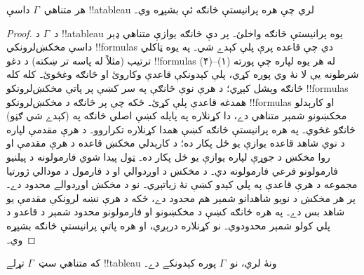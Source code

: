 \documentclass[../../../include/open-logic-section]{subfiles}
\begin{document}
\begin{prop}
  هر متناهي~$\Gamma$ داسې !!a{tableau} لري چې هره پرانيستې څانګه ئې بشپړه وي۔
\end{prop}

\begin{proof}
  د~$\Gamma$ د !!a{tableau} يوه پرانيستې څانګه واخلئ۔ پر دې
  څانګه يوازې متناهي ډېر داسې مخکښ‌لرونکي !!{formula}s دي چې
  قاعده پرې پلې کېدے شي۔ په يوه ټاکلي ترتيب (مثلاً له پاسه
  تر ښکته) د دغو !!{formula}s له هر يوه لپاره چې پورته (۱)–(۴) شرطونه
  يې لا نۀ وي پوره کړي، پلې کېدونکې قاعدې وکاروئ او څانګه
  وغځوئ۔ کله کله څانګه وېشل کېږي؛ د هرې نوې څانګې په سر کښې
  پر پاتې مخکښ‌لرونکو !!{formula}s همدغه قاعدې پلې کړئ۔
  ځکه چې پر څانګه د مخکښ‌لرونکو !!{formula}s او کارېدلو
  مخکښونو شمېر متناهي دے، دا کړنلاره په پايله کښې اصلي
  څانګه په (کېدے شي ګڼو) څانګو غځوي۔ په هره پرانيستې څانګه
  کښې همدا کړنلاره تکراروو۔ د هرې مقدمې لپاره د نوي شاهد قاعده
  يوازې يو ځل پکار ده؛ د کارېدلي مخکښ قاعده د هرې مقدمې او
  روا مخکښ د جوړې لپاره يوازې يو ځل پکار ده۔ ټول پيدا شوي
  فارمولونه د پيلنيو فارمولونو فرعي فارمولونه دي۔ د مخکښ د
  اوږدوالي او د فارمول د مودالي ژورتيا مجموعه د هرې قاعدې
  په پلي کېدو کښې نۀ زياتېږي۔ نو د مخکښ اوږدوالے محدود دے۔
  پر هر مخکښ د نويو شاهدانو شمېر هم محدود دے، ځکه د هرې
  نښه لرونکې مقدمې يو شاهد بس دے۔ په هره څانګه کښې د مخکښونو
  او فارمولونو محدود شمېر د قاعدو د پلي کولو شمېر محدودوي۔
  نو کړنلاره درېږي، او هره پاتې پرانيستې څانګه بشپړه وي۔
\end{proof}

\begin{thm}[بشپړتيا]
  که متناهي سټ~$\Gamma$ تړلے !!{tableau} ونۀ لري، نو~$\Gamma$ پوره کېدونکے دے۔
\end{thm}
\end{document}
